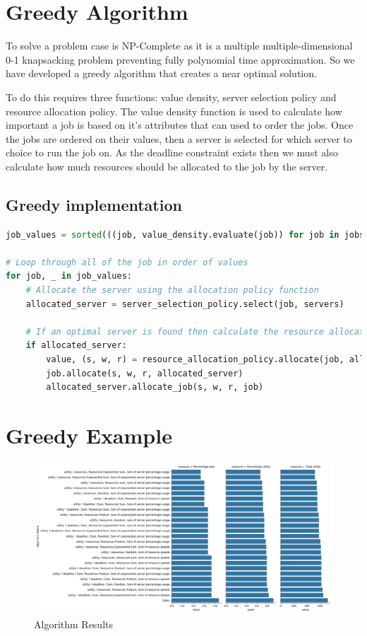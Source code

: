 \documentclass[fleqn]{article}
\begin{document}
\section{Greedy Algorithm}\label{sec:greedy-algorithm}
To solve a problem case is NP-Complete as it is a multiple multiple-dimensional 0-1 knapsacking problem preventing fully polynomial time approximation.
So we have developed a greedy algorithm that creates a near optimal solution.

To do this requires three functions: value density, server selection policy and resource allocation policy.
The value density function is used to calculate how important a job is based on it's attributes that can used to order the jobs.
Once the jobs are ordered on their values, then a server is selected for which server to choice to run the job on.
As the deadline constraint exists then we must also calculate how much resources should be allocated to the job by the server.

\subsection{Greedy implementation}\label{subsec:greedy-implementation}
\begin{lstlisting}[language=Python]
job_values = sorted(((job, value_density.evaluate(job)) for job in jobs), key=lambda jv: jv[1], reverse=True)

# Loop through all of the job in order of values
for job, _ in job_values:
    # Allocate the server using the allocation policy function
    allocated_server = server_selection_policy.select(job, servers)

    # If an optimal server is found then calculate the resource allocation policy
    if allocated_server:
        value, (s, w, r) = resource_allocation_policy.allocate(job, allocated_server)
        job.allocate(s, w, r, allocated_server)
        allocated_server.allocate_job(s, w, r, job)
\end{lstlisting}

\section{Greedy Example}\label{sec:greedy-example}
\begin{figure}[H]
    \centering
    \includegraphics[width=1\linewidth]{../results/greedy_algorithms.png}
    \caption{Algorithm Results}
\end{figure}
\end{document}
